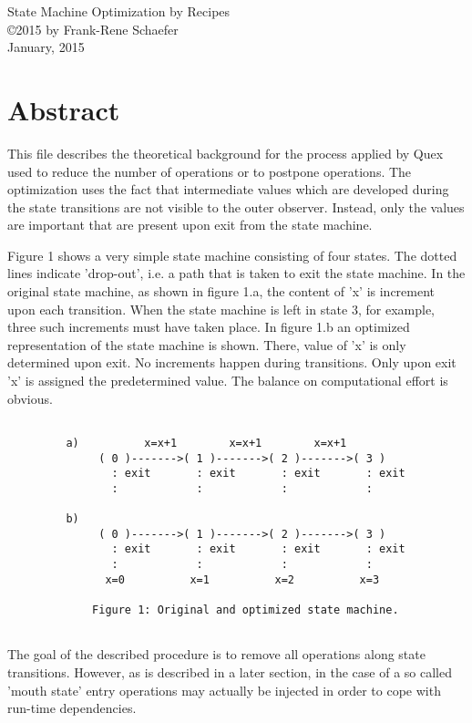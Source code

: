 \documentclass[12pt]{article}
\begin{document}
\begin{center}
{\large State Machine Optimization by Recipes} \\ 
\copyright 2015 by Frank-Rene Schaefer         \\
January, 2015
\end{center}

\section{Abstract}

This file describes the theoretical background for the process applied by Quex
used to reduce the number of operations or to postpone operations.  The
optimization uses the fact that intermediate values which are developed during
the state transitions are not visible to the outer observer. Instead, only the
values are important that are present upon exit from the state machine.

Figure 1 shows a very simple state machine consisting of four states.  The
dotted lines indicate 'drop-out', i.e. a path that is taken to exit the state
machine.  In the original state machine, as shown in figure 1.a, the content of
'x' is increment upon each transition. When the state machine is left in state
3, for example, three such increments must have taken place. In figure 1.b an
optimized representation of the state machine is shown.  There, value of 'x' is
only determined upon exit.  No increments happen during transitions. Only upon
exit 'x' is assigned the predetermined value. The balance on computational
effort is obvious.

\begin{verbatim}
    
         a)          x=x+1        x=x+1        x=x+1
              ( 0 )------->( 1 )------->( 2 )------->( 3 )
                : exit       : exit       : exit       : exit
                :            :            :            :
    
         b)
              ( 0 )------->( 1 )------->( 2 )------->( 3 )
                : exit       : exit       : exit       : exit
                :            :            :            :
               x=0          x=1          x=2          x=3
    
             Figure 1: Original and optimized state machine.
                 
\end{verbatim}
     
The goal of the described procedure is to remove all operations along state
transitions. However, as is described in a later section, in the case of a 
so called 'mouth state' entry operations may actually be injected in order
to cope with run-time dependencies.
\end{document}
